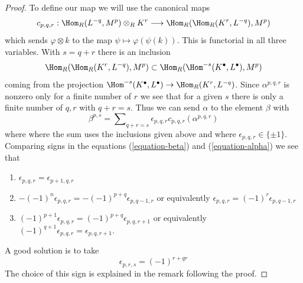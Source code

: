 \begin{proof}
\noindent
To define our map we will use the canonical maps
$$
c_{p, q, r} : 
\Hom_R(L^{-q}, M^p) \otimes_R K^r
\longrightarrow
\Hom_R(\Hom_R(K^r, L^{-q}), M^p)
$$
which sends $\varphi \otimes k$ to the map $\psi \mapsto \varphi(\psi(k))$.
This is functorial in all three variables. With $s = q + r$
there is an inclusion
$$
\Hom_R(\Hom_R(K^r, L^{-q}), M^p) \subset
\Hom_R(\Hom^{-s}(K^\bullet, L^\bullet), M^p)
$$
coming from the projection
$\Hom^{-s}(K^\bullet, L^\bullet) \to \Hom_R(K^r, L^{-q})$.
Since $\alpha^{p, q, r}$
is nonzero only for a finite number of $r$ we see that for a given
$s$ there is only a finite number of $q, r$ with $q + r = s$.
Thus we can send $\alpha$ to the element $\beta$ with
$$
\beta^{p, s} =
\sum\nolimits_{q + r = s} \epsilon_{p, q, r} c_{p, q, r}(\alpha^{p, q, r})
$$
where where the sum uses the inclusions given above and where
$\epsilon_{p, q, r} \in \{\pm 1\}$. Comparing signs in the
equations (\ref{equation-beta}) and (\ref{equation-alpha})
we see that
\begin{enumerate}
\item $\epsilon_{p, q, r} = \epsilon_{p + 1, q, r}$
\item $-(-1)^n\epsilon_{p, q, r} = -(-1)^{p + q}\epsilon_{p, q - 1, r}$
or equivalently $\epsilon_{p, q, r} = (-1)^r\epsilon_{p, q - 1, r}$
\item $(-1)^{p + 1}\epsilon_{p, q, r} = (-1)^{p + q}\epsilon_{p, q, r + 1}$
or equivalently
$(-1)^{q + 1}\epsilon_{p, q, r} = \epsilon_{p, q, r + 1}$.
\end{enumerate}
A good solution is to take
$$
\epsilon_{p, r, s} = (-1)^{r + qr}
$$
The choice of this sign is explained in the remark following
the proof.
\end{proof}

